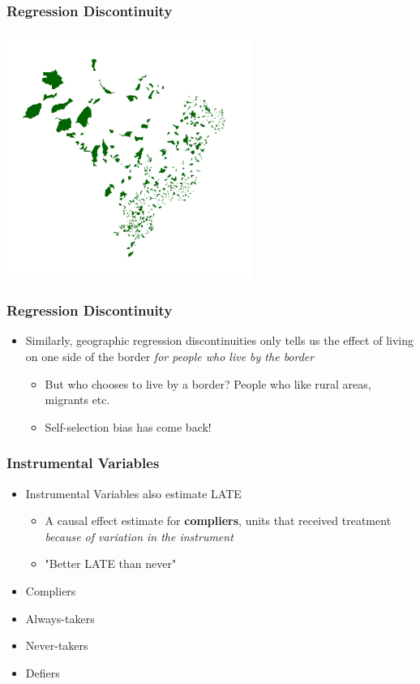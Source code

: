 \documentclass[xcolor=x11names,compress]{beamer}\usepackage[]{graphicx}\usepackage[]{color}
\renewcommand{\(}{\begin{columns}}
\renewcommand{\)}{\end{columns}}
\newcommand{\<}[1]{\begin{column}{#1}}
\renewcommand{\>}{\end{column}}
\begin{document}
\begin{frame}
\frametitle{Regression Discontinuity}
\includegraphics[width=0.6\textwidth]{rd_LATE_map.png}
\end{frame}

\begin{frame}
\frametitle{Regression Discontinuity}
\begin{itemize}
\item Similarly, geographic regression discontinuities only tells us the effect of living on one side of the border \textit{for people who live by the border}
\pause
\begin{itemize}
\item But who chooses to live by a border? People who like rural areas, migrants etc.
\pause
\item Self-selection bias has come back!
\end{itemize}
\end{itemize}
\end{frame}

\begin{frame}
\frametitle{Instrumental Variables}
\begin{itemize}
\item Instrumental Variables also estimate LATE
\begin{itemize}
\item A causal effect estimate for \textbf{compliers}, units that received treatment \textit{because of variation in the instrument}
\item "Better LATE than never"
\end{itemize}
\item Compliers
\item Always-takers
\item Never-takers
\item Defiers
\end{itemize}
\end{frame}
\end{document}
